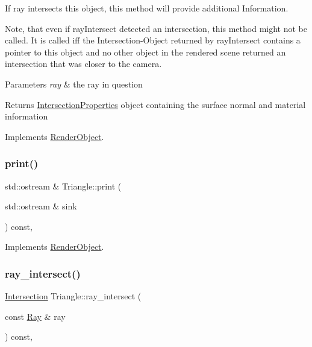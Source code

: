 If ray intersects this object, this method will provide additional Information. 

Note, that even if ray\+Intersect detected an intersection, this method might not be called. It is called iff the Intersection-\/\+Object returned by ray\+Intersect contains a pointer to this object and no other object in the rendered scene returned an intersection that was closer to the camera.


\begin{DoxyParams}{Parameters}
{\em ray} & the ray in question \\
\hline
\end{DoxyParams}
\begin{DoxyReturn}{Returns}
\mbox{\hyperlink{classIntersectionProperties}{Intersection\+Properties}} object containing the surface normal and material information 
\end{DoxyReturn}


Implements \mbox{\hyperlink{classRenderObject_a792d36570e3264530872187ca1b0baca}{Render\+Object}}.

\mbox{\label{classTriangle_af5089786289dbeb3a5f41affb4edb569}} 
\subsubsection{\texorpdfstring{print()}{print()}}
{\footnotesize\ttfamily std\+::ostream \& Triangle\+::print (\begin{DoxyParamCaption}\item[{std\+::ostream \&}]{sink }\end{DoxyParamCaption}) const\hspace{0.3cm}{\ttfamily [override]}, {\ttfamily [virtual]}}



Implements \mbox{\hyperlink{classRenderObject_a7a7f1168a7d96ca95235b170ff7fb11b}{Render\+Object}}.

\mbox{\label{classTriangle_a1ee77d1d4ddeae939e08711b30dbf4f0}} 
\subsubsection{\texorpdfstring{ray\_intersect()}{ray\_intersect()}}
{\footnotesize\ttfamily \mbox{\hyperlink{classIntersection}{Intersection}} Triangle\+::ray\+\_\+intersect (\begin{DoxyParamCaption}\item[{const \mbox{\hyperlink{classRay}{Ray}} \&}]{ray }\end{DoxyParamCaption}) const\hspace{0.3cm}{\ttfamily [override]}, {\ttfamily [virtual]}}



